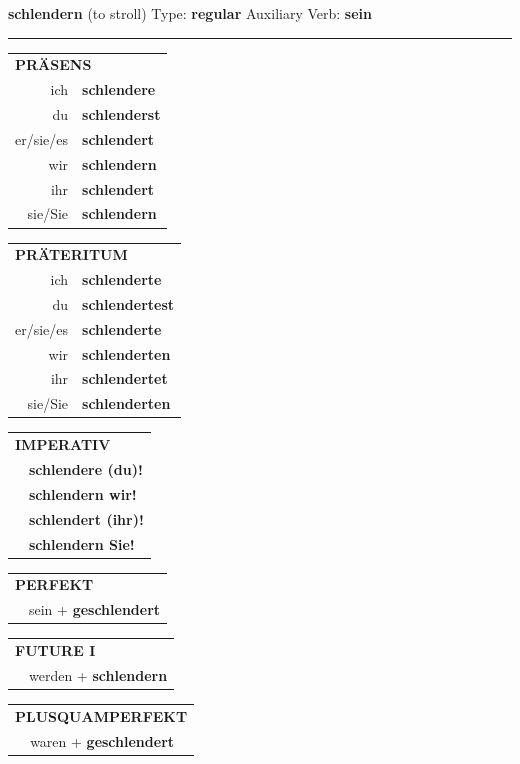 \documentclass[10pt,a4paper]{revtex4-2}
\begin{document}
\begin{verbbox}
{\Large \bf schlendern} (to stroll) \hfill Type: \textbf{regular} \hfill Auxiliary Verb: \textbf{sein}

\vspace{5pt}
\hrule
\vspace{5pt}

\begin{tabular}{rl}
\multicolumn{2}{l}{\textbf{PRÄSENS}}\\
ich & \textbf{schlendere}\\
du & \textbf{schlenderst}\\
er/sie/es & \textbf{schlendert}\\
wir & \textbf{schlendern}\\
ihr & \textbf{schlendert}\\
sie/Sie & \textbf{schlendern}\\
\end{tabular}
\hfill
\begin{tabular}{rl}
\multicolumn{2}{l}{\textbf{PRÄTERITUM}}\\
ich & \textbf{schlenderte}\\
du & \textbf{schlendertest}\\
er/sie/es & \textbf{schlenderte}\\
wir & \textbf{schlenderten}\\
ihr & \textbf{schlendertet}\\
sie/Sie & \textbf{schlenderten}\\
\end{tabular}
\hfill
\begin{tabular}{rl}
\multicolumn{2}{l}{\textbf{IMPERATIV}}\\
& \textbf{schlendere (du)!}\\
& \textbf{schlendern wir!}\\
& \textbf{schlendert (ihr)!}\\
& \textbf{schlendern Sie!}\\
\end{tabular}

\vspace{10pt}

\begin{tabular}{rl}
\multicolumn{2}{l}{\textbf{PERFEKT}}\\
& sein + \textbf{geschlendert}\\
\end{tabular}
\hfill
\begin{tabular}{rl}
\multicolumn{2}{l}{\textbf{FUTURE I}}\\
& werden + \textbf{schlendern}\\
\end{tabular}
\hfill
\begin{tabular}{rl}
\multicolumn{2}{l}{\textbf{PLUSQUAMPERFEKT}}\\
& waren + \textbf{geschlendert}\\
\end{tabular}


\end{verbbox}
\end{document}
